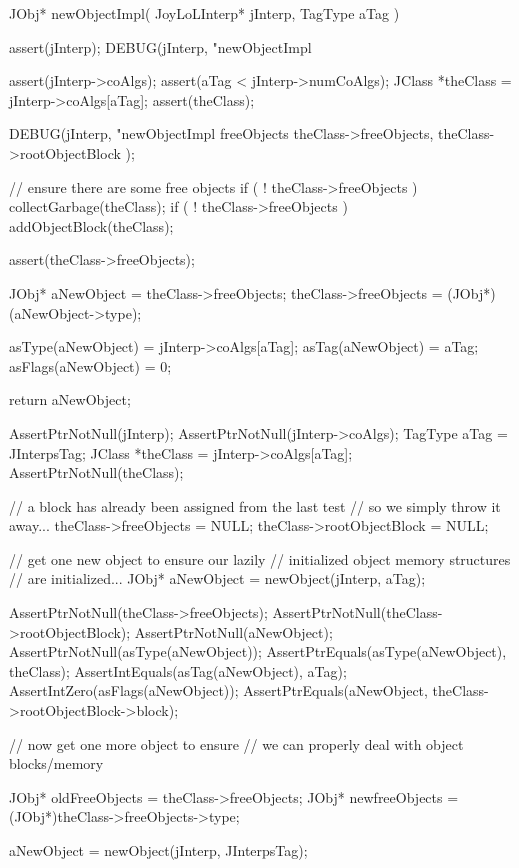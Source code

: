 \startCCode
JObj* newObjectImpl(
  JoyLoLInterp* jInterp,
  TagType aTag
) {
  assert(jInterp);
  DEBUG(jInterp, "newObjectImpl %
  
  assert(jInterp->coAlgs);
  assert(aTag < jInterp->numCoAlgs);
  JClass *theClass = jInterp->coAlgs[aTag];
  assert(theClass);

  DEBUG(jInterp, "newObjectImpl freeObjects %
    theClass->freeObjects,
    theClass->rootObjectBlock
  ); 

  // ensure there are some free objects
  if ( ! theClass->freeObjects ) 
    collectGarbage(theClass);
  if ( ! theClass->freeObjects )
    addObjectBlock(theClass);

  assert(theClass->freeObjects);

  JObj* aNewObject   = theClass->freeObjects;
  theClass->freeObjects = (JObj*)(aNewObject->type);

  asType(aNewObject)  = jInterp->coAlgs[aTag];
  asTag(aNewObject)   = aTag;
  asFlags(aNewObject) = 0;

  return aNewObject;
}
\stopCCode

\startCTest
  AssertPtrNotNull(jInterp);
  AssertPtrNotNull(jInterp->coAlgs);
  TagType aTag = JInterpsTag;
  JClass *theClass = jInterp->coAlgs[aTag];
  AssertPtrNotNull(theClass);
  
  // a block has already been assigned from the last test
  // so we simply throw it away...
  theClass->freeObjects = NULL;
  theClass->rootObjectBlock = NULL;

  // get one new object to ensure our lazily
  // initialized object memory structures 
  // are initialized...
  JObj* aNewObject = newObject(jInterp, aTag);
  
  AssertPtrNotNull(theClass->freeObjects);
  AssertPtrNotNull(theClass->rootObjectBlock);
  AssertPtrNotNull(aNewObject);
  AssertPtrNotNull(asType(aNewObject));
  AssertPtrEquals(asType(aNewObject), theClass);
  AssertIntEquals(asTag(aNewObject), aTag);
  AssertIntZero(asFlags(aNewObject));
  AssertPtrEquals(aNewObject,
    theClass->rootObjectBlock->block);

  // now get one more object to ensure
  // we can properly deal with object blocks/memory
  
  JObj* oldFreeObjects =
    theClass->freeObjects;
  JObj* newfreeObjects = 
    (JObj*)theClass->freeObjects->type;

  aNewObject = newObject(jInterp, JInterpsTag);

